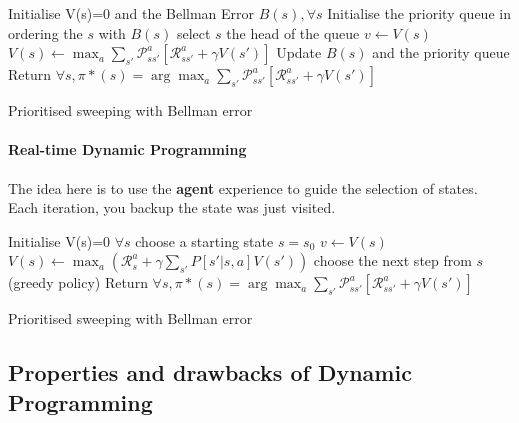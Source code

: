 		\begin{algorithm}[H]
				Initialise V(s)=0 and the Bellman Error $B(s), \forall s$ \;
				Initialise the priority queue in ordering the $s$ with $B(s)$\;
				{
					select $s$ the head of the queue
					{
						$v \leftarrow V(s)$ \;
						$V(s) \leftarrow \max_a \sum_{s'} \mathcal{P}^a_{ss'}[\mathcal{R}^a_{ss'} + \gamma V(s')]$ \;
						Update $B(s)$ and the priority queue \;
					}
				}
				Return $\forall s, \pi*(s) = \arg \max_a  \sum_{s'} \mathcal{P}^a_{ss'}[\mathcal{R}^a_{ss'} + \gamma V(s')]$ \;
				\caption{Prioritised sweeping with Bellman error}
			\end{algorithm}


		\paragraph{Real-time Dynamic Programming} %
			\label{par:real_time_dynamic_programming}

			The idea here is to use the \textbf{agent} experience to guide the selection of states. Each iteration, you backup the state was just visited.

			\begin{algorithm}[H]
				Initialise V(s)=0 $ \forall s$ \;
				choose a starting state $s = s_0$\;
				{
					{
						$v \leftarrow V(s)$ \;
						$V(s) \leftarrow \max_a ( \mathcal{R}^a_{s} +  \gamma \sum_{s'} P[s' | s, a] V(s'))$ \;
						choose the next step from $s$ (greedy policy)\;
					}
				}
				Return $\forall s, \pi*(s) = \arg \max_a  \sum_{s'} \mathcal{P}^a_{ss'}[\mathcal{R}^a_{ss'} + \gamma V(s')]$ \;
				\caption{Prioritised sweeping with Bellman error}
			\end{algorithm}

		

	
	\subsection{Properties and drawbacks of Dynamic Programming} %
		\label{sub:properties_and_drawbacks_of_dynamic_programming}

